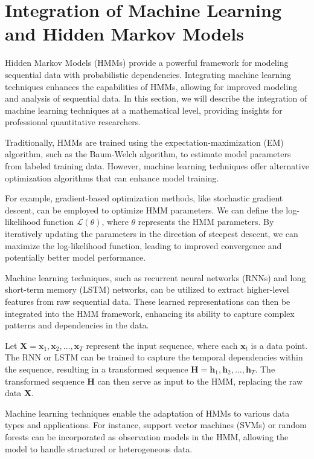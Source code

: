 \documentclass[a4paper,11pt]{article}
\begin{document}
\section{Integration of Machine Learning and Hidden Markov Models}
\label{sec:ML-and-HHM}

Hidden Markov Models (HMMs) provide a powerful framework for modeling sequential data with probabilistic dependencies. Integrating machine learning techniques enhances the capabilities of HMMs, allowing for improved modeling and analysis of sequential data. In this section, we will describe the integration of machine learning techniques at a mathematical level, providing insights for professional quantitative researchers.

Traditionally, HMMs are trained using the expectation-maximization (EM) algorithm, such as the Baum-Welch algorithm, to estimate model parameters from labeled training data. However, machine learning techniques offer alternative optimization algorithms that can enhance model training.

For example, gradient-based optimization methods, like stochastic gradient descent, can be employed to optimize HMM parameters. We can define the log-likelihood function $\mathcal{L}(\theta)$, where $\theta$ represents the HMM parameters. By iteratively updating the parameters in the direction of steepest descent, we can maximize the log-likelihood function, leading to improved convergence and potentially better model performance.

Machine learning techniques, such as recurrent neural networks (RNNs) and long short-term memory (LSTM) networks, can be utilized to extract higher-level features from raw sequential data. These learned representations can then be integrated into the HMM framework, enhancing its ability to capture complex patterns and dependencies in the data.

Let $\mathbf{X} = {\mathbf{x}_1, \mathbf{x}_2, \ldots, \mathbf{x}_T}$ represent the input sequence, where each $\mathbf{x}_t$ is a data point. The RNN or LSTM can be trained to capture the temporal dependencies within the sequence, resulting in a transformed sequence $\mathbf{H} = {\mathbf{h}_1, \mathbf{h}_2, \ldots, \mathbf{h}_T}$. The transformed sequence $\mathbf{H}$ can then serve as input to the HMM, replacing the raw data $\mathbf{X}$.

Machine learning techniques enable the adaptation of HMMs to various data types and applications. For instance, support vector machines (SVMs) or random forests can be incorporated as observation models in the HMM, allowing the model to handle structured or heterogeneous data.
\end{document}
